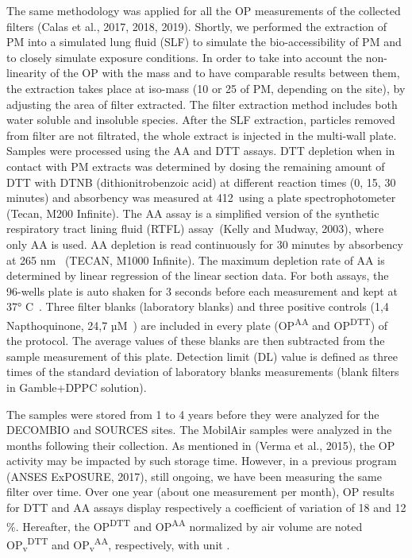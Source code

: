 \documentclass[
]{article}
\begin{document}
The same methodology was applied for all the OP measurements of the
collected filters (Calas et al., 2017, 2018, 2019). Shortly, we
performed the extraction of PM into a simulated lung fluid (SLF) to
simulate the bio-accessibility of PM and to closely simulate exposure
conditions. In order to take into account the non-linearity of the OP
with the mass and to have comparable results between them, the
extraction takes place at iso-mass (10 or 25 of PM, depending on the
site), by adjusting the area of filter extracted. The filter extraction
method includes both water soluble and insoluble species. After the SLF
extraction, particles removed from filter are not filtrated, the whole
extract is injected in the multi-wall plate. Samples were processed
using the AA and DTT assays. DTT depletion when in contact with PM
extracts was determined by dosing the remaining amount of DTT with DTNB
(dithionitrobenzoic acid) at different reaction times (0, 15, 30
minutes) and absorbency was measured at 412~using a plate
spectrophotometer (Tecan, M200 Infinite). The AA assay is a simplified
version of the synthetic respiratory tract lining fluid (RTFL)
assay~(Kelly and Mudway, 2003), where only AA is used. AA depletion is
read continuously for 30 minutes by absorbency at 265 nm~ (TECAN, M1000
Infinite). The maximum depletion rate of AA is determined by linear
regression of the linear section data. For both assays, the 96-wells
plate is auto shaken for 3 seconds before each measurement and kept at
37° C~. Three filter blanks (laboratory blanks) and three positive
controls (1,4 Napthoquinone, 24,7 µM~) are included in every plate
(OP\textsuperscript{AA} and OP\textsuperscript{DTT}) of the protocol.
The average values of these blanks are then subtracted from the sample
measurement of this plate. Detection limit (DL) value is defined as
three times of the standard deviation of laboratory blanks measurements
(blank filters in Gamble+DPPC solution).

The samples were stored from 1 to 4 years before they were analyzed for
the DECOMBIO and SOURCES sites. The MobilAir samples were analyzed in
the months following their collection. As mentioned in (Verma et al.,
2015), the OP activity may be impacted by such storage time. However, in
a previous program (ANSES ExPOSURE, 2017), still ongoing, we have been
measuring the same filter over time. Over one year (about one
measurement per month), OP results for DTT and AA assays display
respectively a coefficient of variation of 18 and 12 \%. Hereafter, the
OP\textsuperscript{DTT} and OP\textsuperscript{AA} normalized by air
volume are noted OP\textsubscript{v}\textsuperscript{DTT} and
OP\textsubscript{v}\textsuperscript{AA}, respectively, with unit .
\end{document}
